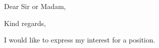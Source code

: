 \date{\today}

\opening{Dear Sir or Madam,}
\closing{Kind regards,}

\makeletterhead

I would like to express my interest for a position.

\makeletterclosing